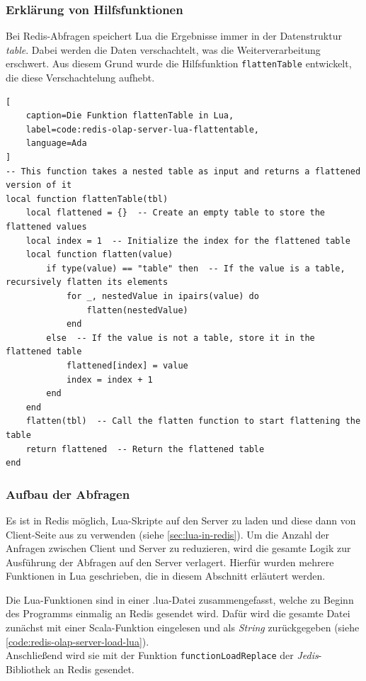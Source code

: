 \subsubsection{Erklärung von Hilfsfunktionen}
Bei Redis-Abfragen speichert Lua die Ergebnisse immer in der Datenstruktur \emph{table}. Dabei werden die Daten verschachtelt, was die Weiterverarbeitung erschwert. Aus diesem Grund wurde die Hilfsfunktion \lstinline|flattenTable| entwickelt, die diese Verschachtelung aufhebt.

\begin{lstlisting}[
    caption=Die Funktion flattenTable in Lua,
    label=code:redis-olap-server-lua-flattentable,
    language=Ada
]
-- This function takes a nested table as input and returns a flattened version of it
local function flattenTable(tbl)
    local flattened = {}  -- Create an empty table to store the flattened values
    local index = 1  -- Initialize the index for the flattened table
    local function flatten(value)
        if type(value) == "table" then  -- If the value is a table, recursively flatten its elements
            for _, nestedValue in ipairs(value) do
                flatten(nestedValue)
            end
        else  -- If the value is not a table, store it in the flattened table
            flattened[index] = value
            index = index + 1
        end
    end
    flatten(tbl)  -- Call the flatten function to start flattening the table
    return flattened  -- Return the flattened table
end
\end{lstlisting}


\subsubsection{Aufbau der Abfragen}
Es ist in Redis möglich, Lua-Skripte auf den Server zu laden und diese dann von Client-Seite aus zu verwenden (siehe \cref{sec:lua-in-redis}).
Um die Anzahl der Anfragen zwischen Client und Server zu reduzieren, wird die gesamte Logik zur Ausführung der Abfragen auf den Server verlagert. Hierfür wurden mehrere Funktionen in Lua geschrieben, die in diesem Abschnitt erläutert werden.

Die Lua-Funktionen sind in einer .lua-Datei zusammengefasst, welche zu Beginn des Programms einmalig an Redis gesendet wird. Dafür wird die gesamte Datei zunächst mit einer Scala-Funktion eingelesen und als \emph{String} zurückgegeben (siehe \cref{code:redis-olap-server-load-lua}).\\
Anschließend wird sie mit der Funktion \lstinline|functionLoadReplace| der \emph{Jedis}-Bibliothek an Redis gesendet.

